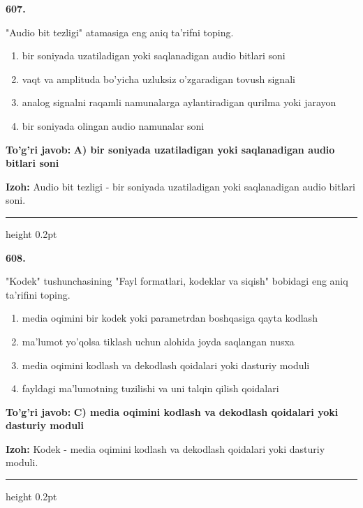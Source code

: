 \documentclass[10pt,a4paper,oneside]{article}
\begin{document}
\noindent\textbf{\color{ink}607.}
\par
"Audio bit tezligi" atamasiga eng aniq ta'rifni toping.
\begin{enumerate}[label=\Alph*),leftmargin=9mm]
\item bir soniyada uzatiladigan yoki saqlanadigan audio bitlari soni
\item vaqt va amplituda bo'yicha uzluksiz o'zgaradigan tovush signali
\item analog signalni raqamli namunalarga aylantiradigan qurilma yoki jarayon
\item bir soniyada olingan audio namunalar soni
\end{enumerate}
\begin{tcolorbox}[enhanced,breakable,colback=teal!4,colframe=teal!50!black,boxrule=0.5pt,arc=1.1mm,left=3mm,right=3mm,top=1.7mm,bottom=1.7mm,before skip=2mm,after skip=2mm]
\textbf{\color{teal}To'g'ri javob:} \textbf{A) bir soniyada uzatiladigan yoki saqlanadigan audio bitlari soni}
\par\smallskip
\textbf{Izoh:} Audio bit tezligi - bir soniyada uzatiladigan yoki saqlanadigan audio bitlari soni.
\end{tcolorbox}
\vspace{2mm}\hrule height 0.2pt \vspace{3mm}

\noindent\textbf{\color{ink}608.}
\par
"Kodek" tushunchasining "Fayl formatlari, kodeklar va siqish" bobidagi eng aniq ta'rifini toping.
\begin{enumerate}[label=\Alph*),leftmargin=9mm]
\item media oqimini bir kodek yoki parametrdan boshqasiga qayta kodlash
\item ma'lumot yo'qolsa tiklash uchun alohida joyda saqlangan nusxa
\item media oqimini kodlash va dekodlash qoidalari yoki dasturiy moduli
\item fayldagi ma'lumotning tuzilishi va uni talqin qilish qoidalari
\end{enumerate}
\begin{tcolorbox}[enhanced,breakable,colback=teal!4,colframe=teal!50!black,boxrule=0.5pt,arc=1.1mm,left=3mm,right=3mm,top=1.7mm,bottom=1.7mm,before skip=2mm,after skip=2mm]
\textbf{\color{teal}To'g'ri javob:} \textbf{C) media oqimini kodlash va dekodlash qoidalari yoki dasturiy moduli}
\par\smallskip
\textbf{Izoh:} Kodek - media oqimini kodlash va dekodlash qoidalari yoki dasturiy moduli.
\end{tcolorbox}
\vspace{2mm}\hrule height 0.2pt \vspace{3mm}
\end{document}
